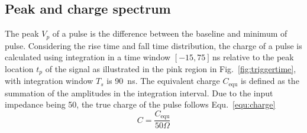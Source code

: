 





\subsection{Peak and charge spectrum}
\label{sec:noisepeak}

The peak $V_p$ of a pulse is the difference between the baseline and minimum of pulse. Considering the rise time and fall time distribution, the charge of a pulse is calculated using integration in a time window $[-15, 75]$\,ns relative to the peak location $t_p$ of the signal as illustrated in the pink region in Fig.~\ref{fig:triggertime}, with integration window $T_s$ is \SI{90}{ns}. The equivalent charge $C_{\mathrm{equ}}$ is defined as the summation of the amplitudes in the integration interval. Due to the input impedance being \SI{50}{\Omega}, the true charge of the pulse follows Equ.~\eqref{equ:charge} 
\begin{equation}
    \label{equ:charge}
    C = \frac{C_{\mathrm{equ}}}{50 \Omega}
\end{equation}

